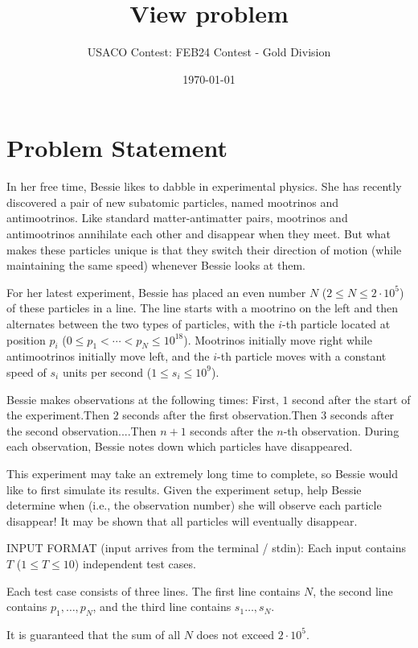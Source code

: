 \documentclass[12pt]{article}
\title{View problem}
\author{USACO Contest: FEB24 Contest - Gold Division}
\date{\today}
\begin{document}
\maketitle

\section*{Problem Statement}


In her free time, Bessie likes to dabble in experimental physics. She has
recently discovered a pair of new subatomic particles, named mootrinos
and antimootrinos. Like standard
 matter-antimatter pairs,
mootrinos and antimootrinos annihilate each other and disappear when they meet.
But what makes these particles unique is that they switch their direction of
motion (while maintaining the same speed) whenever Bessie looks at them.

For her latest experiment, Bessie has placed an even number $N$
($2 \leq N \leq 2 \cdot 10^5$)
of these particles in a line. The line starts with a mootrino on the left and
then alternates between the two types of particles, with the $i$-th particle
located at position $p_i$ ($0 \leq p_1 < \cdots < p_N \leq 10^{18}$). Mootrinos
initially move right while antimootrinos initially move left, and
the $i$-th particle moves with a constant speed of $s_i$ units per second
($1 \leq s_i \leq 10^9$).

Bessie makes observations at the following times:
First, $1$ second after the start of the experiment.Then $2$
seconds after the first observation.Then $3$ seconds after the second
observation....Then $n + 1$ seconds after the $n$-th observation.
During each observation, Bessie notes down which particles have disappeared.

This experiment may take an extremely long time to complete, so Bessie would
like to first simulate its results. Given the experiment setup, help Bessie
determine when (i.e., the observation number) she will observe each
particle disappear! It may be shown that all particles will eventually
disappear.

INPUT FORMAT (input arrives from the terminal / stdin):
Each input contains $T$ ($1\le T\le 10$) independent test cases.

Each test case consists of three lines. The first line contains $N$, the second
line contains $p_1,\dots,p_N$, and the third line contains $s_1\dots,s_N$.

It is guaranteed that the sum of all $N$ does not exceed $2\cdot 10^5$.
\end{document}
